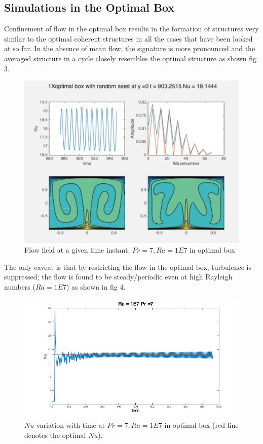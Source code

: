 \documentclass[12pt]{article}
\begin{document}
      \subsection{Simulations in the Optimal Box}
      
      Confinement of flow in the optimal box results in the formation of structures very similar to the optimal coherent structures in all the cases that have been looked at so far. In the absence of mean flow, the signature is more pronounced and the averaged structure in a cycle closely resembles the optimal structure as shown fig 3.
      
      \begin{figure}[!htb]
      	\includegraphics[width=\linewidth]{1E7opt.png}
      	\caption{Flow field at a given time instant, $Pr = 7, Ra = 1E7$ in optimal box}
      	\label{fig:fig3}
      \end{figure}
      
      
      The only caveat is that by restricting the flow in the optimal box, turbulence is suppressed; the flow is found to be steady/periodic even at high Rayleigh numbers ($Ra = 1E7$) as shown in fig 4.
      
      \begin{figure}[!htb]
      	\includegraphics[width=\linewidth]{Nu1E77opt.png}
      	\caption{$Nu$ variation with time at $Pr = 7, Ra = 1E7$ in optimal box (red line denotes the optimal $Nu$).}
      	\label{fig:fig5}
      \end{figure}  
\end{document}
